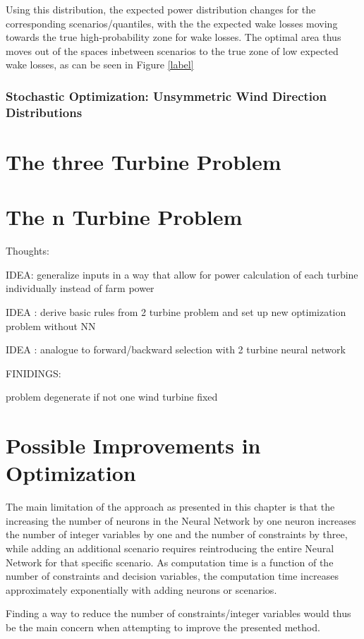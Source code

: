 Using this distribution, the expected power distribution changes for the corresponding scenarios/quantiles, with the the expected wake losses moving towards the true high-probability zone for wake losses. The optimal area thus moves out of the spaces inbetween scenarios to the true zone of low expected wake losses, as can be seen in Figure \ref{label}

\subsubsection{Stochastic Optimization: Unsymmetric Wind Direction Distributions}


\section{The three Turbine Problem}

\section{The n Turbine Problem}

Thoughts: 

IDEA: generalize inputs in a way that allow for power calculation of each turbine individually instead of farm power

IDEA : derive basic rules from 2 turbine problem and set up new optimization problem without NN 

IDEA : analogue to forward/backward selection with 2 turbine neural network


FINIDINGS: 

problem degenerate if not one wind turbine fixed

\section{Possible Improvements in Optimization}

The main limitation of the approach as presented in this chapter is that the increasing the number of neurons in the Neural Network by one neuron increases the number of integer variables by one and the number of constraints by three, while adding an additional scenario requires reintroducing the entire Neural Network for that specific scenario. As computation time is a function of the number of constraints and decision variables, the computation time increases approximately exponentially with adding neurons or scenarios. 

Finding a way to reduce the number of constraints/integer variables would thus be the main concern when attempting to improve the presented method. 
